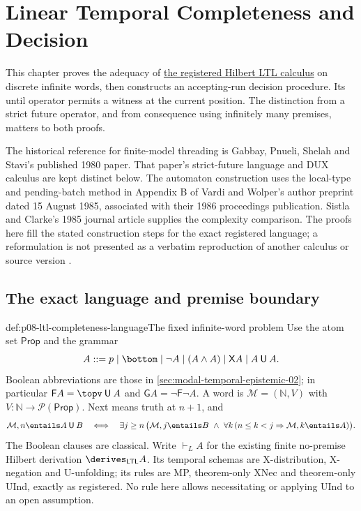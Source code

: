 \section{Linear Temporal Completeness and Decision}
\label{sec:p08-linear-temporal-completeness}

This chapter proves the adequacy of
\hyperref[sheet:hilbert-ltl]{the registered Hilbert LTL calculus}
on discrete infinite words, then constructs an accepting-run decision
procedure. Its until operator permits a witness at the current position.
The distinction from a strict future operator, and from consequence
using infinitely many premises, matters to both proofs.

The historical reference for finite-model threading is Gabbay,
Pnueli, Shelah and Stavi's published 1980 paper. That paper's
strict-future language and DUX calculus are kept distinct below.
The automaton construction uses the local-type and pending-batch
method in Appendix B of Vardi and Wolper's author preprint dated
15 August 1985, associated with their 1986 proceedings publication.
Sistla and Clarke's 1985 journal article supplies the complexity
comparison. The proofs here fill the stated construction steps for
the exact registered language; a reformulation is not presented as
a verbatim reproduction of another calculus or source version
\cite{GabbayPnueliShelahStavi1980,VardiWolper1986,SistlaClarke1985}.

\subsection{The exact language and premise boundary}
\label{sec:p08-ltl-completeness-language}

\begin{hbdefinition}{def:p08-ltl-completeness-language}{The fixed infinite-word problem}
Use the atom set \(\mathsf{Prop}\) and the grammar
\[
 A::=p\mid\bottom\mid\neg A\mid(A\land A)
       \mid\mathsf X A\mid A\mathbin{\mathsf U}A.
\]
Boolean abbreviations are those in
\cref{sec:modal-temporal-epistemic-02}; in particular
\(\mathsf F A=\topv\mathbin{\mathsf U}A\) and
\(\mathsf G A=\neg\mathsf F\neg A\).
A word is \(\mathcal M=(\mathbb N,V)\) with
\(V:\mathbb N\to\mathcal P(\mathsf{Prop})\). Next means truth at
\(n+1\), and
\[
 \mathcal M,n\entails A\mathbin{\mathsf U}B
 \quad\Longleftrightarrow\quad
 \exists j\geq n\,
 \bigl(\mathcal M,j\entails B\ \land\
       \forall k\,(n\leq k<j\Rightarrow\mathcal M,k\entails A)\bigr).
\]
The Boolean clauses are classical. Write \(\vdash_L A\) for the
existing finite no-premise Hilbert derivation
\(\derives_{\mathsf{LTL}}A\). Its temporal schemas are X-distribution,
X-negation and U-unfolding; its rules are MP, theorem-only XNec
and theorem-only UInd, exactly as registered. No rule here allows
necessitating or applying UInd to an open assumption.
\end{hbdefinition}

